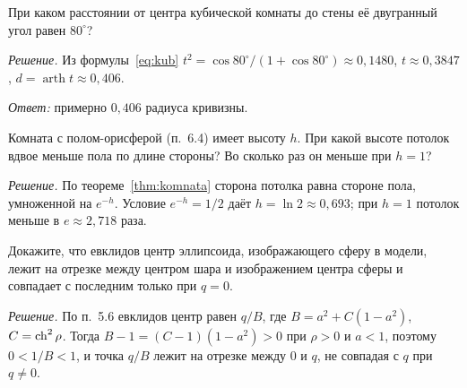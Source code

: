 \begin{task}
При каком расстоянии от центра кубической комнаты до стены её двугранный угол равен $80^\circ$?
\end{task}
\textit{Решение.} Из формулы~\eqref{eq:kub} $t^2=\cos80^\circ/(1+\cos80^\circ)\approx0{,}1480$, $t\approx0{,}3847$, $d=\operatorname{arth}t\approx0{,}406$.

\textit{Ответ:} примерно $0{,}406$ радиуса кривизны.

\begin{task}
Комната с полом-орисферой (п.~6.4) имеет высоту $h$. При какой высоте потолок вдвое меньше пола по длине стороны? Во сколько раз он меньше при $h=1$?
\end{task}
\textit{Решение.} По теореме~\ref{thm:komnata} сторона потолка равна стороне пола, умноженной на $e^{-h}$. Условие $e^{-h}=1/2$ даёт $h=\ln2\approx0{,}693$; при $h=1$ потолок меньше в $e\approx2{,}718$ раза.

\begin{task}
Докажите, что евклидов центр эллипсоида, изображающего сферу в модели, лежит на отрезке между центром шара и изображением центра сферы и совпадает с последним только при $q=0$.
\end{task}
\textit{Решение.} По п.~5.6 евклидов центр равен $q/B$, где $B=a^2+C(1-a^2)$, $C=\operatorname{ch}^2\rho$. Тогда $B-1=(C-1)(1-a^2)>0$ при $\rho>0$ и $a<1$, поэтому $0<1/B<1$, и точка $q/B$ лежит на отрезке между $0$ и $q$, не совпадая с $q$ при $q\ne0$.

